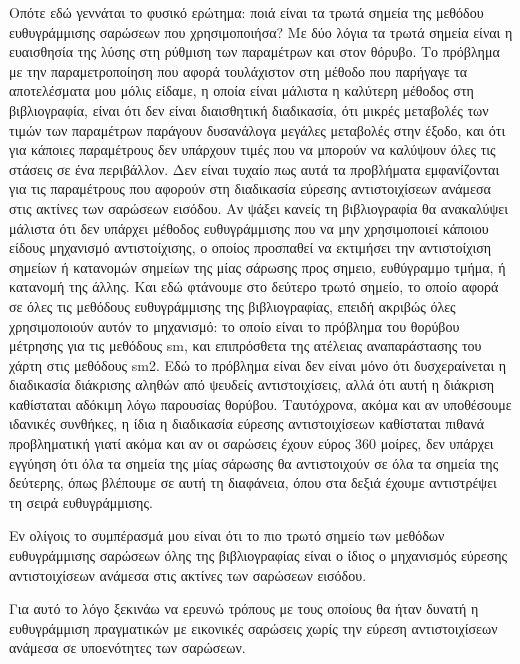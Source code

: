 \documentclass[a4paper,10pt]{article}
\begin{document}
Οπότε εδώ γεννάται το φυσικό ερώτημα: ποιά είναι τα τρωτά σημεία της μεθόδου
ευθυγράμμισης σαρώσεων που χρησιμοποιήσα? Με δύο λόγια τα τρωτά σημεία είναι η
ευαισθησία της λύσης στη ρύθμιση των παραμέτρων και στον θόρυβο. Το πρόβλημα με
την παραμετροποίηση που αφορά τουλάχιστον στη μέθοδο που παρήγαγε τα
αποτελέσματα μου μόλις είδαμε, η οποία είναι μάλιστα η καλύτερη μέθοδος στη
βιβλιογραφία, είναι ότι δεν είναι διαισθητική διαδικασία, ότι μικρές μεταβολές
των τιμών των παραμέτρων παράγουν δυσανάλογα μεγάλες μεταβολές στην έξοδο, και
ότι για κάποιες παραμέτρους δεν υπάρχουν τιμές που να μπορούν να καλύψουν όλες
τις στάσεις σε ένα περιβάλλον. Δεν είναι τυχαίο πως αυτά τα προβλήματα
εμφανίζονται για τις παραμέτρους που αφορούν στη διαδικασία εύρεσης
αντιστοιχίσεων ανάμεσα στις ακτίνες των σαρώσεων εισόδου. Αν ψάξει κανείς τη
βιβλιογραφία θα ανακαλύψει μάλιστα ότι δεν υπάρχει μέθοδος ευθυγράμμισης που να
μην χρησιμοποιεί κάποιου είδους μηχανισμό αντιστοίχισης, ο οποίος προσπαθεί να
εκτιμήσει την αντιστοίχιση σημείων ή κατανομών σημείων της μίας σάρωσης προς
σημειο, ευθύγραμμο τμήμα, ή κατανομή της άλλης. Και εδώ φτάνουμε στο δεύτερο
τρωτό σημείο, το οποίο αφορά σε όλες τις μεθόδους ευθυγράμμισης της
βιβλιογραφίας, επειδή ακριβώς όλες χρησιμοποιούν αυτόν το μηχανισμό: το οποίο
είναι το πρόβλημα του θορύβου μέτρησης για τις μεθόδους sm, και επιπρόσθετα της
ατέλειας αναπαράστασης του χάρτη στις μεθόδους sm2. Εδώ το πρόβλημα είναι δεν
είναι μόνο ότι δυσχεραίνεται η διαδικασία διάκρισης αληθών από ψευδείς
αντιστοιχίσεις, αλλά ότι αυτή η διάκριση καθίσταται αδόκιμη λόγω παρουσίας
θορύβου. Ταυτόχρονα, ακόμα και αν υποθέσουμε ιδανικές συνθήκες, η ίδια η
διαδικασία εύρεσης αντιστοιχίσεων καθίσταται πιθανά προβληματική γιατί ακόμα
και αν οι σαρώσεις έχουν εύρος 360 μοίρες, δεν υπάρχει εγγύηση ότι όλα τα
σημεία της μίας σάρωσης θα αντιστοιχούν σε όλα τα σημεία της δεύτερης, όπως
βλέπουμε σε αυτή τη διαφάνεια, όπου στα δεξιά έχουμε αντιστρέψει τη σειρά
ευθυγράμμισης.

Εν ολίγοις το συμπέρασμά μου είναι ότι το πιο τρωτό σημείο των
μεθόδων ευθυγράμμισης σαρώσεων όλης της βιβλιογραφίας είναι ο ίδιος ο
μηχανισμός εύρεσης αντιστοιχίσεων ανάμεσα στις ακτίνες των σαρώσεων εισόδου.

Για αυτό το λόγο ξεκινάω να ερευνώ τρόπους με τους οποίους θα ήταν δυνατή η
ευθυγράμμιση πραγματικών με εικονικές σαρώσεις χωρίς την εύρεση αντιστοιχίσεων
ανάμεσα σε υποενότητες των σαρώσεων.


\end{document}
